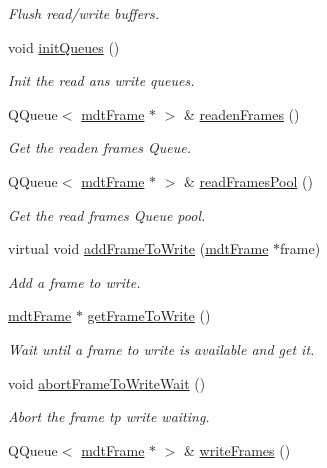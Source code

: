 \begin{DoxyCompactItemize}
\begin{DoxyCompactList}\small\item\em Flush read/write buffers. \end{DoxyCompactList}\item 
void \hyperlink{classmdt_abstract_port_adf06d095d6c3e6ce939a3998bcf8b829}{initQueues} ()
\begin{DoxyCompactList}\small\item\em Init the read ans write queues. \end{DoxyCompactList}\item 
QQueue$<$ \hyperlink{classmdt_frame}{mdtFrame} $\ast$ $>$ \& \hyperlink{classmdt_abstract_port_a05356a33dc546a11d2794a0419d749e0}{readenFrames} ()
\begin{DoxyCompactList}\small\item\em Get the readen frames Queue. \end{DoxyCompactList}\item 
QQueue$<$ \hyperlink{classmdt_frame}{mdtFrame} $\ast$ $>$ \& \hyperlink{classmdt_abstract_port_a3850ab819a8fc5dad22af14b74c45274}{readFramesPool} ()
\begin{DoxyCompactList}\small\item\em Get the read frames Queue pool. \end{DoxyCompactList}\item 
virtual void \hyperlink{classmdt_abstract_port_a9a69eb2fc07d551ab37c011487fa319d}{addFrameToWrite} (\hyperlink{classmdt_frame}{mdtFrame} $\ast$frame)
\begin{DoxyCompactList}\small\item\em Add a frame to write. \end{DoxyCompactList}\item 
\hyperlink{classmdt_frame}{mdtFrame} $\ast$ \hyperlink{classmdt_abstract_port_a6c5ebd4451aec959efc4e71ab1b13941}{getFrameToWrite} ()
\begin{DoxyCompactList}\small\item\em Wait until a frame to write is available and get it. \end{DoxyCompactList}\item 
void \hyperlink{classmdt_abstract_port_ae67c815f68317c70e398eaa86622af6b}{abortFrameToWriteWait} ()
\begin{DoxyCompactList}\small\item\em Abort the frame tp write waiting. \end{DoxyCompactList}\item 
QQueue$<$ \hyperlink{classmdt_frame}{mdtFrame} $\ast$ $>$ \& \hyperlink{classmdt_abstract_port_a4fed10be147dfce6ca315467ff3fb968}{writeFrames} ()

\end{DoxyCompactItemize}
